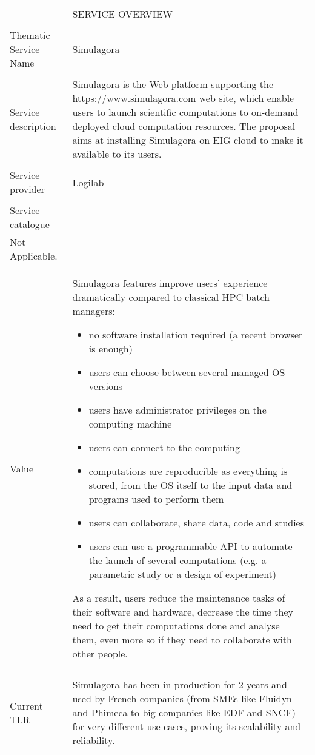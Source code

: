 \begin{tabular}{|p{7cm}|p{7cm}|}
\hline
 & SERVICE OVERVIEW\\
\\\hline
Thematic Service Name&Simulagora\\
\\\hline
Service description&
%
Simulagora is the Web platform supporting the
https://www.simulagora.com web site, which enable users to launch
scientific computations to on-demand deployed cloud computation
resources. The proposal aims at installing Simulagora on EIG cloud to
make it available to its users.
\\
\\\hline
Service provider&Logilab\\
\\\hline
Service catalogue&\\
%
Not Applicable.

\\\hline
Value&
%
Simulagora features improve users' experience dramatically compared to
classical HPC batch managers:
\begin {itemize}
\item no software installation required (a recent browser is enough)
\item users can choose between several managed OS versions
\item users have administrator privileges on the computing machine
\item users can connect to the computing
\item computations are reproducible as everything is stored, from the
  OS itself to the input data and programs used to perform them
\item users can collaborate, share data, code and studies
\item users can use a programmable API to automate the launch of
  several computations (e.g. a parametric study or a design of
  experiment)
\end {itemize}
%
As a result, users reduce the maintenance tasks of their software and
hardware, decrease the time they need to get their computations done
and analyse them, even more so if they need to collaborate with other
people.
\\
\\\hline
Current TLR&
%
Simulagora has been in production for 2 years and used by French
companies (from SMEs like Fluidyn and Phimeca to big companies like
EDF and SNCF) for very different use cases, proving its scalability
and reliability.


\end{tabular}
